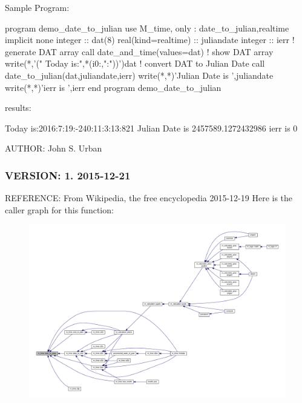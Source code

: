 \begin{DoxyVerb}Sample Program:

 program demo_date_to_julian
 use M_time, only : date_to_julian,realtime
 implicit none
 integer             :: dat(8)
 real(kind=realtime) :: juliandate
 integer             :: ierr
    ! generate DAT array
    call date_and_time(values=dat)
    ! show DAT array
    write(*,'(" Today is:",*(i0:,":"))')dat
    ! convert DAT to Julian Date
    call date_to_julian(dat,juliandate,ierr)
    write(*,*)'Julian Date is ',juliandate
    write(*,*)'ierr is ',ierr
 end program demo_date_to_julian

results:

 Today is:2016:7:19:-240:11:3:13:821
 Julian Date is    2457589.1272432986
 ierr is            0 \end{DoxyVerb}
 A\+U\+T\+H\+OR\+: John S. Urban \subsubsection*{V\+E\+R\+S\+I\+ON\+: 1. 2015-\/12-\/21}

R\+E\+F\+E\+R\+E\+N\+CE\+: From Wikipedia, the free encyclopedia 2015-\/12-\/19 Here is the caller graph for this function\+:
\nopagebreak
\begin{figure}[H]
\begin{center}
\leavevmode
\includegraphics[width=350pt]{namespacem__time_acfdc970b4154b0c15bd33727636e3992_icgraph}
\end{center}
\end{figure}
\mbox{\label{namespacem__time_aed245c691853279ebf0ce899dec9caa9}} 
